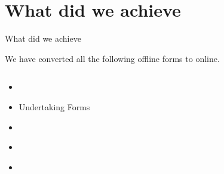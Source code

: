 \documentclass [] {beamer}
\begin{document}
\section{What did we achieve}
\begin{frame}{What did we achieve}


We have converted all the following offline forms to online.

\begin{columns}
    \begin{column}{0.48\textwidth}
\begin{itemize}
    \item \href{https://www.iitb.ac.in/newacadhome/MastersBlankApplicationform.pdf}{}
    \item Undertaking Forms
    \item \href{https://www.iitb.ac.in/newacadhome/Withdrawalform.pdf}{}
    \item \href{https://www.iitb.ac.in/newacadhome/Bonafidenew.pdf}{}

    \item
    \href{https://www.iitb.ac.in/newacadhome/Reexamnewform.pdf}{}
\end{itemize}


\end{column}
\end{columns}
\end{frame}
\end{document}
